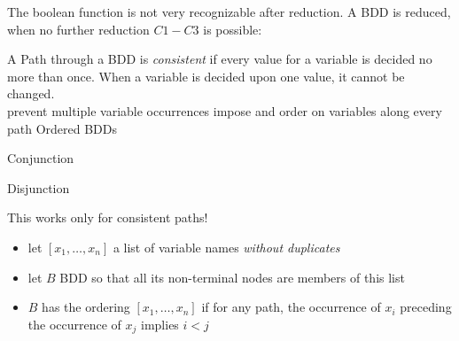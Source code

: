 \documentclass[a4paper, 10pt]{article}
\begin{document}
\begin{mdframed}
\begin{multicols}{2}
\begin{description}
\begin{center}
    \scalebox{1}{}
    \end{center}
\end{description}
\end{multicols}
The boolean function is not very recognizable after reduction.
A BDD is reduced, when no further reduction $C1-C3$ is possible:
\begin{center}
\scalebox{1}{}
\end{center}
\begin{multicols}{3}
\begin{center}
\scalebox{1}{}
\end{center}
\begin{center}
\scalebox{1}{}
\end{center}
\begin{center}
\scalebox{1}{}
\end{center}
\end{multicols}
A Path through a BDD is \emph{consistent} if every value for a variable is decided no more than once. {\tiny When a variable is decided upon one value, it cannot be changed.}
\\ \follows prevent multiple variable occurrences \follows impose and order on variables along every path \follows Ordered BDDs
\begin{multicols}{2}
Conjunction
\begin{center}
\scalebox{1}{}
\end{center}
\columnbreak
Disjunction
\begin{center}
\scalebox{1}{}
\end{center}
\end{multicols}
\begin{center}
This works only for consistent paths!
\end{center}
\begin{itemize}
    \item let $[x_1,\dots,x_n]$ a list of variable names \emph{without duplicates}
    \item let $B$ BDD so that all its non-terminal nodes are members of this list
    \item $B$ has the ordering $[x_1,\dots,x_n]$ if for any path, the occurrence of $x_i$ preceding the occurrence of $x_j$ implies $i<j$

\end{itemize}
\end{mdframed}
\end{document}
